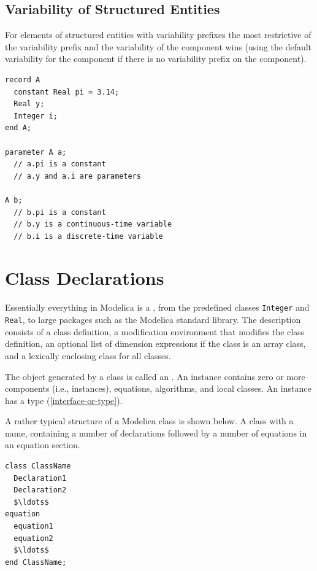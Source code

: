 \subsection{Variability of Structured Entities}\label{variability-of-structured-entities}

For elements of structured entities with variability prefixes the most restrictive of the variability prefix and the variability of the component wins (using the default variability for the component if there is no variability prefix on the component).

\begin{example}
\begin{lstlisting}[language=modelica]
record A
  constant Real pi = 3.14;
  Real y;
  Integer i;
end A;

parameter A a;
  // a.pi is a constant
  // a.y and a.i are parameters

A b;
  // b.pi is a constant
  // b.y is a continuous-time variable
  // b.i is a discrete-time variable
\end{lstlisting}
\end{example}


\section{Class Declarations}\label{class-declarations}

Essentially everything in Modelica is a , from the predefined classes \lstinline!Integer! and \lstinline!Real!, to large packages such as the Modelica standard library.
The description consists of a class definition, a modification environment that modifies the class definition, an optional list of dimension expressions if the class is an array class, and a lexically enclosing class for all classes.

The object generated by a class is called an .
An instance contains zero or more components (i.e., instances), equations, algorithms, and local classes.
An instance has a type (\cref{interface-or-type}).

\begin{example}
A rather typical structure of a Modelica class is shown below.
A class with a name, containing a number of declarations followed by a number of equations in an equation section.
\begin{lstlisting}[language=modelica]
class ClassName
  Declaration1
  Declaration2
  $\ldots$
equation
  equation1
  equation2
  $\ldots$
end ClassName;
\end{lstlisting}
\end{example}

